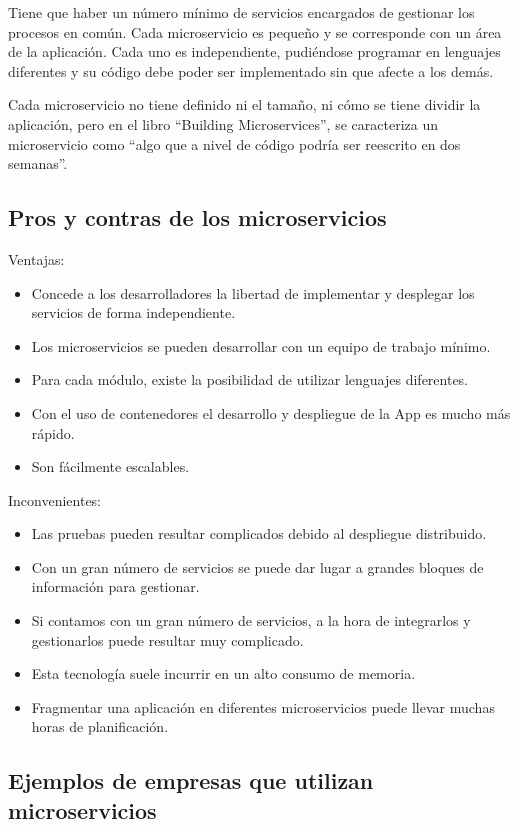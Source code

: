 \documentclass[12pt]{report} %
\begin{document}
Tiene que haber un número mínimo de servicios encargados de gestionar los procesos en común. Cada microservicio es pequeño y se corresponde con un área de la aplicación. Cada uno es independiente, pudiéndose programar en lenguajes diferentes y su código debe poder ser implementado sin que afecte a los demás.

Cada microservicio no tiene definido ni el tamaño, ni cómo se tiene dividir la aplicación, pero en el libro “Building Microservices”, \cite{BuildingMicroservices}se caracteriza un microservicio como “algo que a nivel de código podría ser reescrito en dos semanas”.

\subsection{Pros y contras de los microservicios}
Ventajas:
\begin{itemize}
	\item Concede a los desarrolladores la libertad de implementar y desplegar los servicios de forma independiente.
	\item Los microservicios se pueden desarrollar con un equipo de trabajo mínimo.
	\item Para cada módulo, existe la posibilidad de utilizar lenguajes diferentes.
	\item Con el uso de contenedores el desarrollo y despliegue de la App es mucho más rápido.
	\item Son fácilmente escalables.
\end{itemize}
Inconvenientes:
\begin{itemize}
	\item Las pruebas pueden resultar complicados debido al despliegue distribuido.
	\item Con un gran número de servicios se puede dar lugar a grandes bloques de información para gestionar.
	\item Si contamos con un gran número de servicios, a la hora de integrarlos y gestionarlos puede resultar muy complicado.
	\item Esta tecnología suele incurrir en un alto consumo de memoria.
	\item Fragmentar una aplicación en diferentes microservicios puede llevar muchas horas de planificación.
\end{itemize}

\subsection{Ejemplos de empresas que utilizan microservicios}
\end{document}
